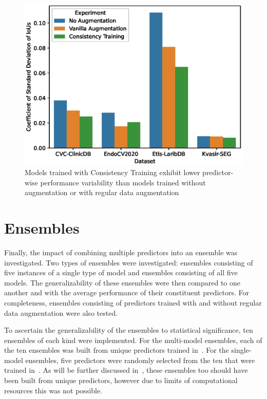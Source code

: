 \begin{figure}[htb]
    \centering
    \includegraphics[width=\linewidth]{illustrations/consistency_training_cstd.eps}
    \caption[Consistency Training performance variability]{Models trained with Consistency Training exhibit lower predictor-wise performance variability than models trained without augmentation or with regular data augmentation}
    \label{fig:consistency_cstd}
\end{figure}

\section{Ensembles}\label{ensembles}

Finally, the impact of combining multiple predictors into an ensemble was investigated. Two types of ensembles were investigated: ensembles consisting of five instances of a single type of model and ensembles consisting of all five models. The generalizability of these ensembles were then compared to one another and with the average performance of their constituent predictors. For completeness, ensembles consisting of predictors trained with and without regular data augmentation were also tested.

To ascertain the generalizability of the ensembles to statistical significance, ten ensembles of each kind were implemented. For the multi-model ensembles, each of the ten ensembles was built from unique predictors trained in~.  For the single-model ensembles, five predictors were randomly selected from the ten that were trained in~. As will be further discussed in~, these ensembles too should have been built from unique predictors, however due to limits of computational resources this was not possible. 

